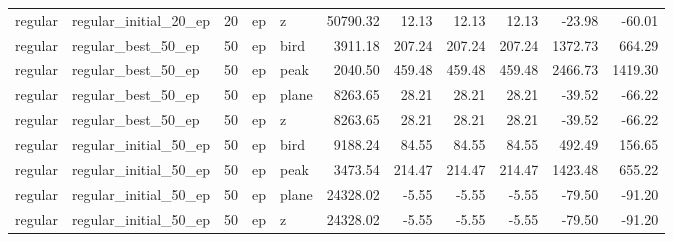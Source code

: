 \begin{tabular}{llrllrrrrrr}
    regular & regular_initial_20_ep & 20 & ep & z & 50790.32 & 12.13 & 12.13 & 12.13 & -23.98 & -60.01 \\
    regular & regular_best_50_ep & 50 & ep & bird & 3911.18 & 207.24 & 207.24 & 207.24 & 1372.73 & 664.29 \\
    regular & regular_best_50_ep & 50 & ep & peak & 2040.50 & 459.48 & 459.48 & 459.48 & 2466.73 & 1419.30 \\
    regular & regular_best_50_ep & 50 & ep & plane & 8263.65 & 28.21 & 28.21 & 28.21 & -39.52 & -66.22 \\
    regular & regular_best_50_ep & 50 & ep & z & 8263.65 & 28.21 & 28.21 & 28.21 & -39.52 & -66.22 \\
    regular & regular_initial_50_ep & 50 & ep & bird & 9188.24 & 84.55 & 84.55 & 84.55 & 492.49 & 156.65 \\
    regular & regular_initial_50_ep & 50 & ep & peak & 3473.54 & 214.47 & 214.47 & 214.47 & 1423.48 & 655.22 \\
    regular & regular_initial_50_ep & 50 & ep & plane & 24328.02 & -5.55 & -5.55 & -5.55 & -79.50 & -91.20 \\
    regular & regular_initial_50_ep & 50 & ep & z & 24328.02 & -5.55 & -5.55 & -5.55 & -79.50 & -91.20 \\
    \bottomrule
    \end{tabular}
